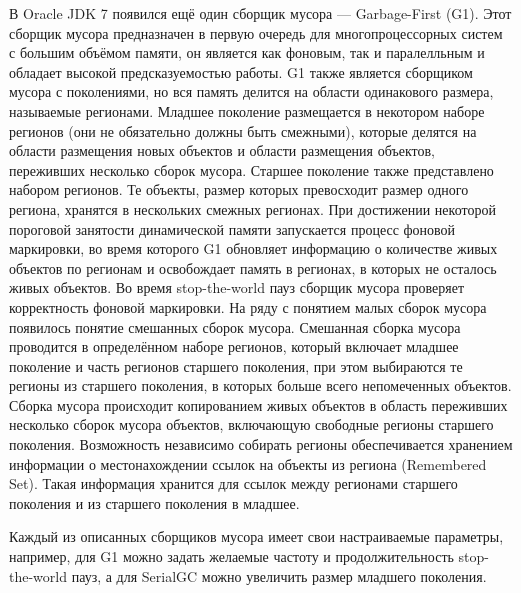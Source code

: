 В Oracle JDK 7 появился ещё один сборщик мусора --- Garbage-First (G1). Этот сборщик 
мусора предназначен в первую очередь для многопроцессорных систем с большим объёмом памяти,
он является как фоновым, так и паралелльным и обладает высокой предсказуемостью работы.
G1 также является сборщиком мусора с поколениями, но вся память делится на области 
одинакового размера, называемые регионами. Младшее поколение размещается в некотором
наборе регионов (они не обязательно должны быть смежными), которые делятся на области размещения новых
объектов и области размещения объектов, переживших несколько сборок мусора. 
Старшее поколение также представлено набором регионов. Те объекты,
размер которых превосходит размер одного региона, хранятся в нескольких смежных регионах.
При достижении некоторой пороговой занятости динамической памяти запускается процесс
фоновой маркировки, во время которого G1 обновляет информацию о количестве живых объектов
по регионам и освобождает память в регионах, в которых не осталось живых объектов. Во
время stop-the-world пауз сборщик мусора проверяет корректность фоновой маркировки.
На ряду с понятием малых сборок мусора появилось понятие
смешанных сборок мусора. Смешанная сборка мусора проводится в определённом
наборе регионов, который включает младшее поколение и часть регионов старшего поколения, при 
этом выбираются те регионы из старшего поколения, в которых больше всего непомеченных объектов.
Сборка мусора происходит копированием живых объектов в область переживших несколько сборок мусора объектов,
включающую свободные регионы старшего поколения. Возможность независимо 
собирать регионы обеспечивается хранением информации о местонахождении ссылок на объекты
из региона (Remembered Set). Такая информация хранится для ссылок между регионами старшего поколения
и из старшего поколения в младшее.

Каждый из описанных сборщиков мусора имеет свои настраиваемые параметры, например, для G1
можно задать желаемые частоту и продолжительность stop-the-world пауз, а для SerialGC
можно увеличить размер младшего поколения. 

